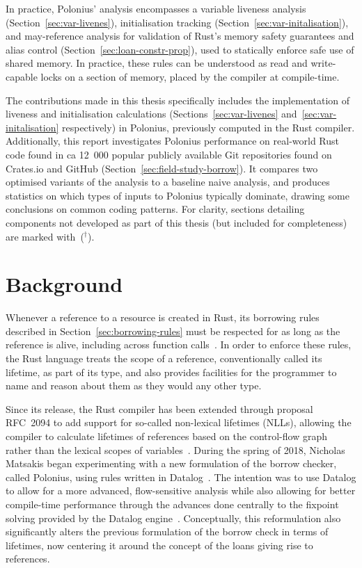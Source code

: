 \documentclass[11pt,a4paper,twoside,openany,draft]{report}
\newcommand{\notmine}[0] {$^\dagger$}
\begin{document}
In practice, Polonius' analysis encompasses a variable liveness analysis
(Section~\ref{sec:var-livenes}), initialisation tracking
(Section~\ref{sec:var-initalisation}), and may-reference analysis for validation
of Rust's memory safety guarantees and alias control
(Section~\ref{sec:loan-constr-prop}), used to statically enforce safe use of
shared memory. In practice, these rules can be understood as read and
write-capable locks on a section of memory, placed by the compiler at
compile-time.

The contributions made in this thesis specifically includes the implementation
of liveness and initialisation calculations (Sections~\ref{sec:var-livenes}
and~\ref{sec:var-initalisation} respectively) in Polonius, previously computed
in the Rust compiler. Additionally, this report investigates Polonius
performance on real-world Rust code found in ca 12~000 popular publicly
available Git repositories found on Crates.io and GitHub
(Section~\ref{sec:field-study-borrow}). It compares two optimised variants of
the analysis to a baseline naive analysis, and produces statistics on which
types of inputs to Polonius typically dominate, drawing some conclusions on
common coding patterns. For clarity, sections detailing components not developed
as part of this thesis (but included for completeness) are marked
with~(\notmine{}).

\chapter{Background}
Whenever a reference to a resource is created in Rust, its borrowing rules
described in Section~\ref{sec:borrowing-rules} must be respected for as long as
the reference is alive, including across function
calls~\cite{nichols_rust_nodate}. In order to enforce these rules, the Rust
language treats the scope of a reference, conventionally called its lifetime, as
part of its type, and also provides facilities for the programmer to name and
reason about them as they would any other type.


{\sloppy
Since its release, the Rust compiler has been extended through proposal RFC~2094
to add support for so-called non-lexical lifetimes (NLLs), allowing the compiler
to calculate lifetimes of references based on the control-flow graph rather than
the lexical scopes of variables~\cite{noauthor_rfc_2019}. During the spring of
2018, Nicholas Matsakis began experimenting with a new formulation of the borrow
checker, called Polonius, using rules written in
Datalog~\cite{matsakis_alias-based_2018}. The intention was to use Datalog to
allow for a more advanced, flow-sensitive analysis while also allowing for
better compile-time performance through the advances done centrally to the
fixpoint solving provided by the Datalog engine~\cite{datafrog}. Conceptually,
this reformulation also significantly alters the previous formulation of the
borrow check in terms of lifetimes, now centering it around the concept of the
loans giving rise to references.}
\end{document}
